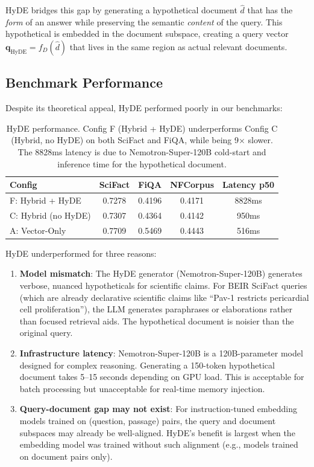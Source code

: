 \documentclass[11pt]{article}
\begin{document}
HyDE bridges this gap by generating a hypothetical document $\hat{d}$ that has the
\emph{form} of an answer while preserving the semantic \emph{content} of the query.
This hypothetical is embedded in the document subspace, creating a query vector
$\mathbf{q}_{\text{HyDE}} = f_D(\hat{d})$ that lives in the same region as actual
relevant documents.

\subsection{Benchmark Performance}

Despite its theoretical appeal, HyDE performed poorly in our benchmarks:

\begin{table}[H]
\centering
\small
\begin{tabular}{lcccc}
\toprule
\textbf{Config} & \textbf{SciFact} & \textbf{FiQA} & \textbf{NFCorpus} & \textbf{Latency p50} \\
\midrule
F: Hybrid + HyDE & 0.7278 & 0.4196 & 0.4171 & 8828ms \\
C: Hybrid (no HyDE) & 0.7307 & 0.4364 & 0.4142 & 950ms \\
A: Vector-Only & 0.7709 & 0.5469 & 0.4443 & 516ms \\
\bottomrule
\end{tabular}
\caption{HyDE performance. Config F (Hybrid + HyDE) underperforms Config C (Hybrid,
no HyDE) on both SciFact and FiQA, while being 9$\times$ slower. The 8828ms latency
is due to Nemotron-Super-120B cold-start and inference time for the hypothetical
document.}
\label{tab:hyde}
\end{table}

HyDE underperformed for three reasons:

\begin{enumerate}[leftmargin=2em, itemsep=4pt]
  \item \textbf{Model mismatch}: The HyDE generator (Nemotron-Super-120B) generates
  verbose, nuanced hypotheticals for scientific claims. For BEIR SciFact queries (which
  are already declarative scientific claims like ``Pav-1 restricts pericardial cell
  proliferation''), the LLM generates paraphrases or elaborations rather than focused
  retrieval aids. The hypothetical document is noisier than the original query.

  \item \textbf{Infrastructure latency}: Nemotron-Super-120B is a 120B-parameter
  model designed for complex reasoning. Generating a 150-token hypothetical document
  takes 5--15 seconds depending on GPU load. This is acceptable for batch processing
  but unacceptable for real-time memory injection.

  \item \textbf{Query-document gap may not exist}: For instruction-tuned embedding
  models trained on (question, passage) pairs, the query and document subspaces may
  already be well-aligned. HyDE's benefit is largest when the embedding model was
  trained without such alignment (e.g., models trained on document pairs only).

\end{enumerate}
\end{document}
